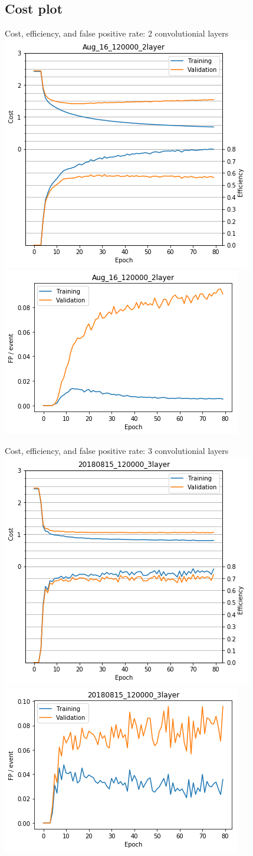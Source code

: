 \subsection{Cost plot}
\begin{frame}{Cost, efficiency, and false positive rate: 2 convolutionial layers}
   \centering
   \includegraphics[width=0.45\linewidth]{images/CNN_2Layer_Cost.png}
   \includegraphics[width=0.45\linewidth]{images/CNN_2Layer_FalsePositive.png}

\end{frame}

\begin{frame}{Cost, efficiency, and false positive rate: 3 convolutionial layers}
   \centering
   \includegraphics[width=0.45\linewidth]{images/CNN_3Layer_Cost.png}
   \includegraphics[width=0.45\linewidth]{images/CNN_3Layer_FalsePositive.png}

\end{frame}
